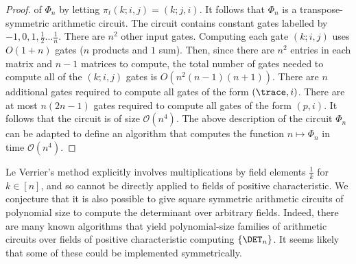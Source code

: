 \documentclass{toc}
\begin{document}
\begin{proof}
  of $\Phi_n$ by letting $\pi_t (k;i,j) = (k;j,i)$. It follows that $\Phi_n$ is
  a transpose-symmetric arithmetic circuit.
  The circuit contains constant gates labelled by $-1, 0, 1, \frac{1}{2} \ldots
  \frac{1}{n}$.  There are $n^2$ other input gates. Computing each gate $(k; i, j)$ uses $O(1+n)$ gates ($n$ products and $1$ sum). Then, since there are $n^2$ entries in each matrix and $n-1$ matrices to compute, the total number of gates needed to compute all of the $(k;i,j)$ gates is $O(n^2 (n-1) (n+1))$. There are $n$ additional gates required to compute all gates of the form $(\trace,
  i)$.  There are at most $n (2n -1)$  gates required to compute all
  gates of the form $(p, i)$. It follows that the circuit is of size
  $\mathcal{O}(n^4)$. The above description of the circuit $\Phi_n$ can be
  adapted to define an algorithm that computes the function $n \mapsto \Phi_n$
  in time $\mathcal{O}(n^4)$.
\end{proof}
Le Verrier's method explicitly involves multiplications by field elements
$\frac{1}{k}$ for $k \in [n]$, and so cannot be directly applied to fields of
positive characteristic. We conjecture that it is also possible to give square
symmetric arithmetic circuits of polynomial size to compute the determinant over
arbitrary fields. Indeed, there are many known algorithms that yield
polynomial-size families of arithmetic circuits over fields of positive
characteristic computing $\{\DET_n\}$. It seems likely that some of these could
be implemented symmetrically.
\end{document}

